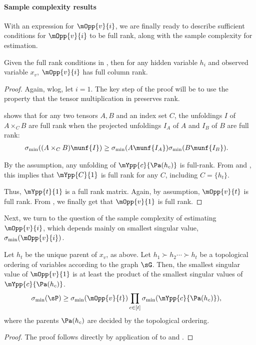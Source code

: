 \paragraph{Sample complexity results}

With an expression for $\mOpp{v}{i}$, we are finally ready to describe
sufficient conditions for $\mOpp{v}{i}$ to be full rank, along with the
sample complexity for estimation.

\begin{lemma}
  \label{lem:full-rank-suff}
  Given the full rank conditions in , then
  for any hidden variable $h_i$ and observed variable $x_v$,
  $\mOpp{v}{i}$ has full column rank.
\end{lemma}
\begin{proof}
Again, wlog, let $i=1$. 
The key step of the proof will be to use the property that the tensor
  multiplication in  preserves rank.

 shows that for any two tensors $A,
  B$ and an index set $C$, the unfoldings $I$ of $A \times_C B$ are full
  rank when the projected unfoldings $I_A$ of $A$ and $I_B$ of $B$ are
  full rank:
\begin{align*}
  \sigma_{\min}( (A \times_C B)\munf{I} )
    &\ge \sigma_{\min}(A\munf{I_A}) \sigma_{\min}(B\munf{I_B}).
\end{align*}

By the assumption, any unfolding of $\mYpp{c}{\Pa(h_c)}$ is full-rank. 
From  and
  , this implies that $\mYpp{C}{1}$ is
  full rank for any $C$, including $C = \{h_t\}$.

Thus, $\mYpp{t}{1}$ is a full rank matrix. 
Again, by assumption,
  $\mOpp{v}{t}$ is full rank. From , we finally
  get that $\mOpp{v}{1}$ is full rank.
\end{proof}

Next, we turn to the question of the sample complexity of estimating
$\mOpp{v}{i}$, which depends mainly on smallest singular value,
$\sigma_{\min}(\mOpp{v}{i})$. 

\begin{lemma}
  \label{lem:mopp-singular-values}

Let $h_t$ be the unique parent of $x_v$, as above.
Let $h_1 \succ h_2 \cdots \succ h_t$ be a topological ordering of
  variables according to the graph $\sG$.
  Then, the smallest singular value of $\mOpp{v}{1}$ is at least the product of the smallest singular values of $\mYpp{c}{\Pa(h_c)}$.
\begin{align*}
  \sigma_{\min}(\sP) &\ge \sigma_{\min}(\mOpp{v}{t}) 
        \prod_{c \in [t]} \sigma_{\min}(\mYpp{c}{\Pa(h_c)}),
\end{align*}
where the parents $\Pa(h_c)$ are decided by the topological ordering. 
\end{lemma}
\begin{proof}
  The proof follows directly by application of
   to  and
  .
\end{proof}

